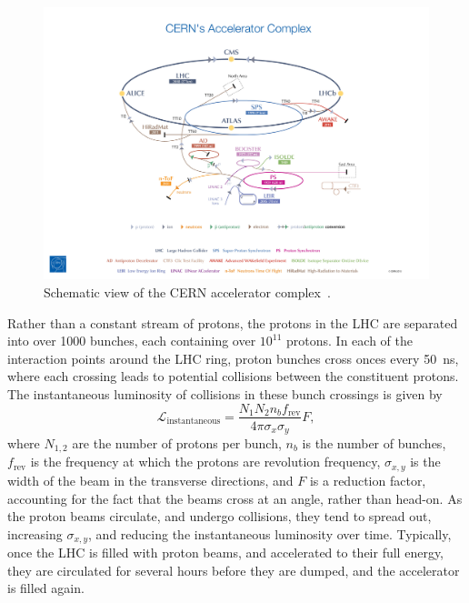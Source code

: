 \begin{figure}[ht]
  \centering
  \includegraphics[width=\textwidth, clip=true, trim=15cm 0 15cm 10cm]
    {figs/lhc/accelerator_complex.jpg}
  \caption{
    Schematic view of the CERN accelerator complex~\cite{Marcastel:1621583}.
  }
  \label{fig:cern_complex}
\end{figure}

Rather than a constant stream of protons, the protons in the LHC are separated
into over 1000 bunches, each containing over $10^{11}$ protons.
In each of the interaction points around the LHC ring, proton bunches cross
onces every 50~ns, where each crossing leads to potential collisions between
the constituent protons.
The instantaneous luminosity of collisions in these bunch crossings is given by
\begin{equation}
  \mathcal{L}_\mathrm{instantaneous} =
  \frac{N_{1}N_{2} n_b f_\mathrm{rev}}
  {4\pi \sigma_{x} \sigma_{y}}
  F,
\end{equation}
where $N_{1,2}$ are the number of protons per bunch, $n_b$ is the number of
bunches, $f_\mathrm{rev}$ is the frequency at which the protons are revolution
frequency, $\sigma_{x,y}$ is the width of the beam in the transverse directions,
and $F$ is a reduction factor, accounting for the fact that the beams cross
at an angle, rather than head-on.
As the proton beams circulate, and undergo collisions, they tend to spread out,
increasing $\sigma_{x,y}$, and reducing the instantaneous luminosity over time.
Typically, once the LHC is filled with proton beams, and accelerated to their
full energy, they are circulated for several hours before they are dumped, and
the accelerator is filled again.

